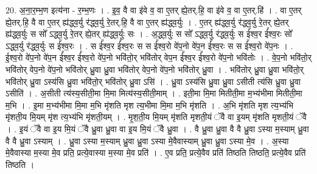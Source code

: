 \documentclass[17pt]{extarticle}
\begin{document}
20. अ॒ना॒र॒म्भ॒ण इत्य॑ना - र॒म्भ॒णः । . इ॒व॒ वै वा इ॑वे व॒ वा ए॒तर् ह्ये॒तर्.हि॒ वा इ॑वे व॒ वा ए॒तर्.हि॑ । . वा ए॒तर् ह्ये॒तर्.हि॒ वै वा ए॒तर् ह्य॑द्ध्व॒र्यु र॑द्ध्व॒र्यु रे॒तर्.हि॒ वै वा ए॒तर् ह्य॑द्ध्व॒र्युः । . ए॒तर् ह्य॑द्ध्व॒र्यु र॑द्ध्व॒र्यु रे॒तर् ह्ये॒तर् ह्य॑द्ध्व॒र्युः स सो᳚ ऽद्ध्व॒र्यु रे॒तर् ह्ये॒तर् ह्य॑द्ध्व॒र्युः सः । . अ॒द्ध्व॒र्युः स सो᳚ ऽद्ध्व॒र्यु र॑द्ध्व॒र्युः स ई᳚श्व॒र ई᳚श्व॒रः सो᳚ ऽद्ध्व॒र्यु र॑द्ध्व॒र्युः स ई᳚श्व॒रः । . स ई᳚श्व॒र ई᳚श्व॒रः स स ई᳚श्व॒रो वे॑प॒नो वे॑प॒न ई᳚श्व॒रः स स ई᳚श्व॒रो वे॑प॒नः । . ई॒श्व॒रो वे॑प॒नो वे॑प॒न ई᳚श्व॒र ई᳚श्व॒रो वे॑प॒नो भवि॑तो॒र् भवि॑तोर् वेप॒न ई᳚श्व॒र ई᳚श्व॒रो वे॑प॒नो भवि॑तोः । . वे॒प॒नो भवि॑तो॒र् भवि॑तोर् वेप॒नो वे॑प॒नो भवि॑तोर् ध्रु॒वा ध्रु॒वा भवि॑तोर् वेप॒नो वे॑प॒नो भवि॑तोर् ध्रु॒वा । . भवि॑तोर् ध्रु॒वा ध्रु॒वा भवि॑तो॒र् भवि॑तोर् ध्रु॒वा ऽस्य॑सि ध्रु॒वा भवि॑तो॒र् भवि॑तोर् ध्रु॒वा ऽसि॑ । . ध्रु॒वा ऽस्य॑सि ध्रु॒वा ध्रु॒वा ऽसीती त्य॑सि ध्रु॒वा ध्रु॒वा ऽसीति॑ । . अ॒सीती त्य॑स्य॒सीती॒मा मि॒मा मित्य॑स्य॒सीती॒माम् । . इती॒मा मि॒मा मितीती॒मा म॒भ्य॑भीमा मितीती॒मा म॒भि । . इ॒मा म॒भ्य॑भीमा मि॒मा म॒भि मृ॑शति मृश त्य॒भीमा मि॒मा म॒भि मृ॑शति । . अ॒भि मृ॑शति मृश त्य॒भ्य॑भि मृ॑शती॒य मि॒यम् मृ॑श त्य॒भ्य॑भि मृ॑शती॒यम् । . मृ॒श॒ती॒य मि॒यम् मृ॑शति मृशती॒यं ॅवै वा इ॒यम् मृ॑शति मृशती॒यं ॅवै । . इ॒यं ॅवै वा इ॒य मि॒यं ॅवै ध्रु॒वा ध्रु॒वा वा इ॒य मि॒यं ॅवै ध्रु॒वा । . वै ध्रु॒वा ध्रु॒वा वै वै ध्रु॒वा ऽस्या म॒स्याम् ध्रु॒वा वै वै ध्रु॒वा ऽस्याम् । . ध्रु॒वा ऽस्या म॒स्याम् ध्रु॒वा ध्रु॒वा ऽस्या मे॒वैवास्याम् ध्रु॒वा ध्रु॒वा ऽस्या मे॒व । . अ॒स्या मे॒वैवास्या म॒स्या मे॒व प्रति॒ प्रत्ये॒वास्या म॒स्या मे॒व प्रति॑ । . ए॒व प्रति॒ प्रत्ये॒वैव प्रति॑ तिष्ठति तिष्ठति॒ प्रत्ये॒वैव प्रति॑ तिष्ठति । \newline
\end{document}
